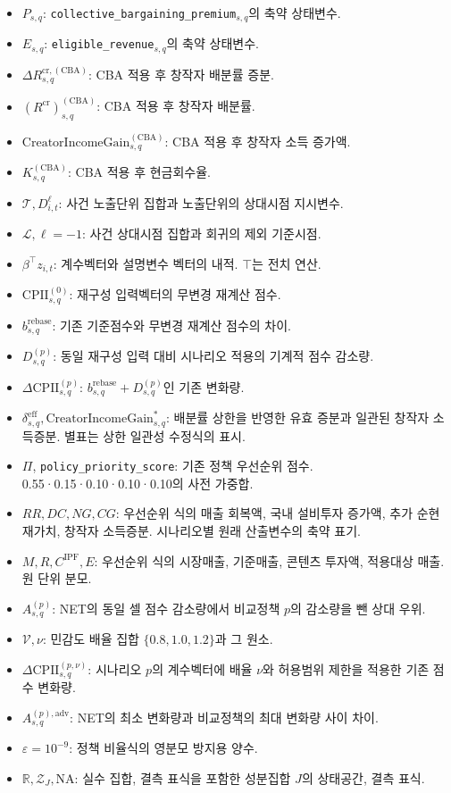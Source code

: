 \documentclass[11pt,a4paper]{report}
\begin{document}
\begin{itemize}[leftmargin=1.8em,itemsep=0.35em]
\item \(P_{s,q}\): \nolinkurl{collective_bargaining_premium}\(_{s,q}\)의 축약 상태변수.
\item \(E_{s,q}\): \nolinkurl{eligible_revenue}\(_{s,q}\)의 축약 상태변수.
\item \(\Delta R^{\mathrm{cr},(\mathrm{CBA})}_{s,q}\): CBA 적용 후 창작자 배분률 증분.
\item \(\left(R^{\mathrm{cr}}\right)^{(\mathrm{CBA})}_{s,q}\): CBA 적용 후 창작자 배분률.
\item \(\mathrm{CreatorIncomeGain}^{(\mathrm{CBA})}_{s,q}\): CBA 적용 후 창작자 소득 증가액.
\item \(K^{(\mathrm{CBA})}_{s,q}\): CBA 적용 후 현금회수율.
\item \(\mathcal T,D^\ell_{i,t}\): 사건 노출단위 집합과 노출단위의 상대시점 지시변수.
\item \(\mathcal L,\ell=-1\): 사건 상대시점 집합과 회귀의 제외 기준시점.
\item \(\beta^\top z_{i,t}\): 계수벡터와 설명변수 벡터의 내적. \(\top\)는 전치 연산.
\item \(\mathrm{CPII}^{(0)}_{s,q}\): 재구성 입력벡터의 무변경 재계산 점수.
\item \(b^{\mathrm{rebase}}_{s,q}\): 기존 기준점수와 무변경 재계산 점수의 차이.
\item \(D^{(p)}_{s,q}\): 동일 재구성 입력 대비 시나리오 적용의 기계적 점수 감소량.
\item \(\Delta\mathrm{CPII}^{(p)}_{s,q}\): \(b^{\mathrm{rebase}}_{s,q}+D^{(p)}_{s,q}\)인 기존 변화량.
\item \(\delta^{\mathrm{eff}}_{s,q},\mathrm{CreatorIncomeGain}^{*}_{s,q}\): 배분률 상한을 반영한 유효 증분과 일관된 창작자 소득증분. 별표는 상한 일관성 수정식의 표시.
\item \(\Pi\), \nolinkurl{policy_priority_score}: 기존 정책 우선순위 점수. 0.55·0.15·0.10·0.10·0.10의 사전 가중합.
\item \(RR,DC,NG,CG\): 우선순위 식의 매출 회복액, 국내 설비투자 증가액, 추가 순현재가치, 창작자 소득증분. 시나리오별 원래 산출변수의 축약 표기.
\item \(M,R,C^{\mathrm{IPF}},E\): 우선순위 식의 시장매출, 기준매출, 콘텐츠 투자액, 적용대상 매출. 원 단위 분모.
\item \(A^{(p)}_{s,q}\): NET의 동일 셀 점수 감소량에서 비교정책 \(p\)의 감소량을 뺀 상대 우위.
\item \(\mathcal V,\nu\): 민감도 배율 집합 \(\{0.8,1.0,1.2\}\)과 그 원소.
\item \(\Delta\mathrm{CPII}^{(p,\nu)}_{s,q}\): 시나리오 \(p\)의 계수벡터에 배율 \(\nu\)와 허용범위 제한을 적용한 기존 점수 변화량.
\item \(A^{(p),\mathrm{adv}}_{s,q}\): NET의 최소 변화량과 비교정책의 최대 변화량 사이 차이.
\item \(\varepsilon=10^{-9}\): 정책 비율식의 영분모 방지용 양수.
\item \(\mathbb R,\mathcal Z_J,\mathrm{NA}\): 실수 집합, 결측 표식을 포함한 성분집합 \(J\)의 상태공간, 결측 표식.
\end{itemize}
\endgroup
\end{document}
